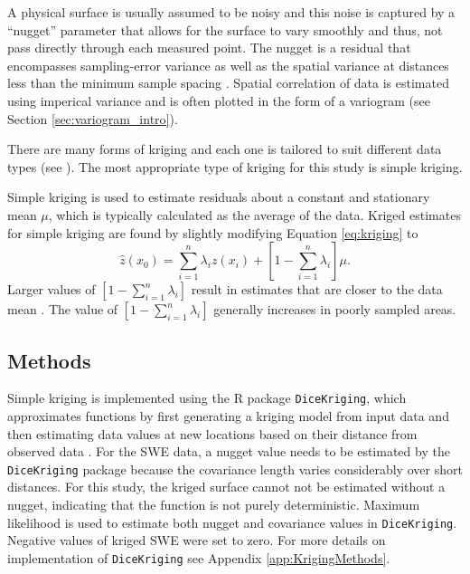 \documentclass[12pt]{article}
\begin{document}
A physical surface is usually assumed to be noisy and this noise is captured by a ``nugget'' parameter that allows for the surface to vary smoothly and thus, not pass directly through each measured point. The nugget is a residual that encompasses sampling-error variance as well as the spatial variance at distances less than the minimum sample spacing \citep{Li2008}. Spatial correlation of data is estimated using imperical variance and is often plotted in the form of a variogram (see Section \ref{sec:variogram_intro}).  

There are many forms of kriging and each one is tailored to suit different data types (see \cite{Li2014}). The most appropriate type of kriging for this study is simple kriging. 

Simple kriging is used to estimate residuals about a constant and stationary mean $\mu$, which is typically calculated as the average of the data. Kriged estimates for simple kriging are found by slightly modifying Equation \ref{eq:kriging} to 
\begin{equation}
\hat{z}(x_0) = \sum_{i=1}^{n} \lambda_i z(x_i) +\left[1-\sum_{i=1}^{n} \lambda_i \right]\mu.
\end{equation}
Larger values of $\left[1-\sum_{i=1}^{n} \lambda_i \right]$ result in estimates that are closer to the data mean \citep{Li2008}. The value of $\left[1-\sum_{i=1}^{n} \lambda_i \right]$ generally increases in poorly sampled areas. 

\subsection{Methods}
\label{sec:kriging_methods}

Simple kriging is implemented using the R package \texttt{DiceKriging}, which approximates functions by first generating a kriging model from input data and then estimating data values at new locations based on their distance from observed data \citep{Roustant2012}. For the SWE data, a nugget value needs to be estimated by the \texttt{DiceKriging} package because the covariance length varies considerably over short distances. For this study, the kriged surface cannot not be estimated without a nugget, indicating that the function is not purely deterministic. Maximum likelihood is used to estimate both nugget and covariance values in \texttt{DiceKriging}. Negative values of kriged SWE were set to zero. For more details on implementation of \texttt{DiceKriging} see Appendix \ref{app:KrigingMethods}.
\end{document}
